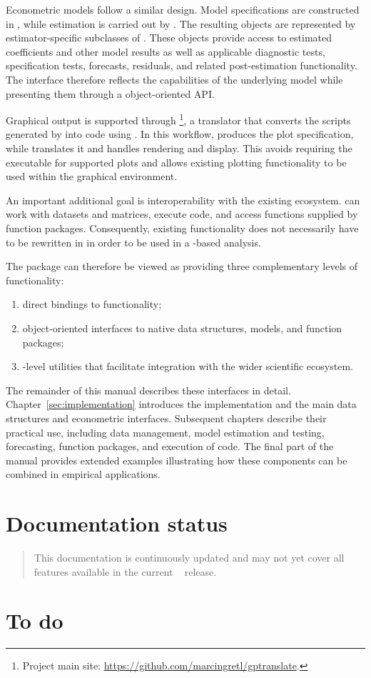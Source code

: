Econometric models follow a similar design. Model specifications are
constructed in \python, while estimation is carried out by \lgretl.
The resulting objects are represented by estimator-specific subclasses
of \classpymodel. These objects provide access to estimated
coefficients and other model results as well as applicable diagnostic
tests, specification tests, forecasts, residuals, and related
post-estimation functionality. The interface therefore reflects the
capabilities of the underlying \gretl model while presenting them
through a \python object-oriented API.

Graphical output is supported through %
\footnote{Project main site: \url{https://github.com/marcingretl/gptranslate}.}, a \cpp
translator that converts the  scripts generated by
\lgretl into \python code using . In this workflow,
\lgretl produces the plot specification, while 
translates it and \python handles rendering and display. This avoids
requiring the  executable for supported plots and allows
existing \lgretl plotting functionality to be used within the
\python graphical environment.

An important additional goal is interoperability with the existing
\gretl ecosystem. \gretlpy can work with \gretl datasets and matrices,
execute \hansl code, and access functions supplied by \gretl function
packages. Consequently, existing \gretl functionality does not
necessarily have to be rewritten in \python in order to be used in a
\python-based analysis.

The package can therefore be viewed as providing three complementary
levels of functionality:
\begin{enumerate}
	\item direct bindings to \lgretl functionality;
	\item object-oriented interfaces to native \gretl data structures,
	models, and function packages;
	\item \python-level utilities that facilitate integration with
	the wider scientific \python ecosystem.
\end{enumerate}

The remainder of this manual describes these interfaces in detail.
Chapter~\ref{sec:implementation} introduces the implementation and the
main \gretlpy data structures and econometric interfaces. Subsequent
chapters describe their practical use, including data management,
model estimation and testing, forecasting, function packages, and
execution of \hansl code. The final part of the manual provides
extended examples illustrating how these components can be combined
in empirical applications.


\section*{Documentation status}

\begin{quote}
	This documentation is continuously updated and may not yet cover
	all features available in the current \gretlpy~\gretlpyversion
	release.
\end{quote}


\section*{To do}

\begin{quote}
	
\end{quote}